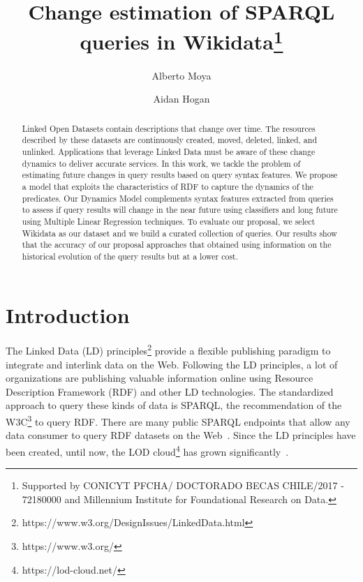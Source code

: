 \documentclass[runningheads]{llncs}
\begin{document}
%
\title{Change estimation of SPARQL queries in Wikidata\thanks{Supported by CONICYT PFCHA/ DOCTORADO BECAS CHILE/2017 - 72180000 and Millennium Institute for Foundational Research on Data.}}
%
%
\author{Alberto Moya \and
Aidan Hogan}%
%
%
%
\maketitle              %
%
\begin{abstract}
Linked Open Datasets contain descriptions that change over time. The resources described by these datasets are continuously created, moved, deleted, linked, and unlinked. Applications that leverage Linked Data must be aware of these change dynamics to deliver accurate services. In this work, we tackle the problem of estimating future changes in query results based on query syntax features. We propose a model that exploits the characteristics of RDF to capture the dynamics of the predicates. Our Dynamics Model complements syntax features extracted from queries to assess if query results will change in the near future using classifiers and long future using Multiple Linear Regression techniques. To evaluate our proposal, we select Wikidata as our dataset and we build a curated collection of queries. Our results show that the accuracy of our proposal approaches that obtained using information on the historical evolution of the query results but at a lower cost.

\end{abstract}
%
%
\section{Introduction}
\label{sec:intro}
%
The Linked Data (LD) principles\footnote{https://www.w3.org/DesignIssues/LinkedData.html} provide a flexible publishing paradigm to integrate and interlink data on the Web. Following the LD principles, a lot of organizations are publishing valuable information online using Resource Description Framework (RDF) and other LD technologies. The standardized approach to query these kinds of data is SPARQL, the recommendation of the W3C\footnote{https://www.w3.org/} to query RDF. There are many public SPARQL endpoints that allow any data consumer to query RDF datasets on the Web~\cite{VandenbusscheUM17}. Since the LD principles have been created, until now, the LOD cloud\footnote{https://lod-cloud.net/} has grown significantly~\cite{SchmachtenbergBP14}.
\end{document}

